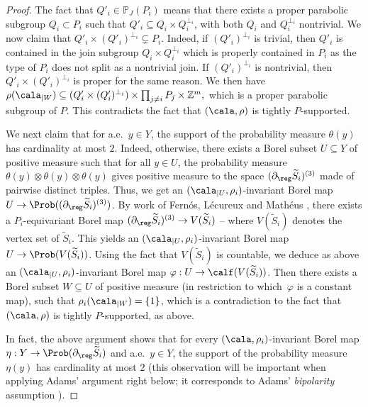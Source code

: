 \begin{proof}
The fact that $Q'_i\in\mathbb{P}_J(P_i)$ means that there exists a proper parabolic subgroup $Q_i\subset P_i$ such that $Q'_i\subseteq Q_i\times Q_i^{\perp_i}$, with both $Q_i$ and $Q_i^{\perp_i}$ nontrivial.
We now claim that $Q'_i\times (Q'_i)^{\perp_i}\subsetneq P_i$. Indeed, if $(Q'_i)^{\perp_i}$ is trivial, then $Q'_i$ is contained in the join subgroup $Q_i\times Q_i^{\perp_i}$ which is properly contained in $P_i$ as the type of $P_i$ does not split as a nontrivial join. If $(Q'_i)^{\perp_i}$ is nontrivial, then $Q'_i\times (Q'_i)^{\perp_i}$ is proper for the same reason. We then have $\rho(\cala_{|W})\subseteq (Q'_i\times (Q'_i)^{\perp_i})\times\prod_{j\neq i} P_j\times \mathbb{Z}^m,$ which is a proper parabolic subgroup of $P$. This contradicts the fact that $(\cala,\rho)$ is tightly $P$-supported.

We next claim that for a.e.\ $y\in Y$, the support of the probability measure $\theta(y)$ has cardinality at most $2$. Indeed, otherwise, there exists a Borel subset $U\subseteq Y$ of positive measure such that for all $y\in U$, the probability measure $\theta(y)\otimes\theta(y)\otimes\theta(y)$ gives positive measure to the space $(\partial_\reg \widetilde{S}_i)^{(3)}$ made of pairwise distinct triples. Thus, we get an $(\cala_{|U},\rho_i)$-invariant Borel map $U\to \Prob((\partial_\reg \widetilde{S}_i)^{(3)})$. By work of Fernós, Lécureux and Mathéus \cite[Lem.\,5.14 \&~6.21]{FLM}, there exists a $P_i$-equivariant Borel map $(\partial_\reg \widetilde{S}_i)^{(3)}\to V(\widetilde{S}_i)$ -- where $V(\widetilde{S}_i)$ denotes the vertex set of $\widetilde{S}_i$.
This yields an $(\cala_{|U},\rho_i)$-invariant Borel map $U\to \Prob(V(\widetilde{S}_i))$. Using the fact that $V(\widetilde{S}_i)$ is countable, we deduce as above an $(\cala_{|U},\rho_i)$-invariant Borel map $\varphi:U\to\calf(V(\widetilde{S}_i))$. Then there exists a Borel subset $W\subseteq U$ of positive measure (in restriction to which~$\varphi$ is a constant map), such that $\rho_i(\cala_{|W})=\{1\}$, which is a contradiction to the fact that $(\cala,\rho)$ is tightly $P$-supported, as above.

In fact, the above argument shows that for every $(\cala,\rho_i)$-invariant Borel map $\eta:Y\to\Prob(\partial_\reg \widetilde{S}_i)$ and a.e.\ $y\in Y$, the support of the probability measure $\eta(y)$ has cardinality at most $2$ (this observation will be important when applying Adams' argument right below; it corresponds to Adams' \emph{bipolarity} assumption \cite[Def.\,3.1]{Ada}).\enlargethispage{\baselineskip}%


\end{proof}
